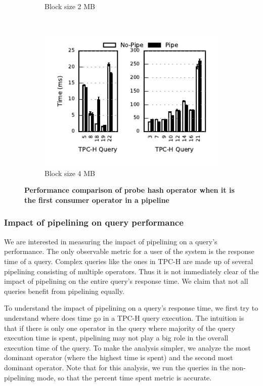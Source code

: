 \begin{figure}[t]
\begin{subfigure}[ht]{0.32\textwidth}
		\caption{Block size 2 MB}		
	\end{subfigure}
	~
	\begin{subfigure}[ht]{0.32\textwidth}
		\includegraphics[width=\textwidth]{pipeline/figures/first-consumer-comparison-4mb-withlip}	
		\caption{Block size 4 MB}
	\end{subfigure}
	\caption{\textbf{Performance comparison of probe hash operator when it is the first consumer operator in a pipeline}}
	\label{fig:first-consumer-comparison}
\end{figure}

\subsubsection{Impact of pipelining on query performance}
We are interested in measuring the impact of pipelining on a query's performance.
The only observable metric for a user of the system is the response time of a query.
Complex queries like the ones in TPC-H are made up of several pipelining consisting of multiple operators.
Thus it is not immediately clear of the impact of pipelining on the entire query's response time. 
We claim that not all queries benefit from pipelining equally.

To understand the impact of pipelining on a query's response time, we first try to understand where does time go in a TPC-H query execution.
The intuition is that if there is only one operator in the query where majority of the query execution time is spent, pipelining may not play a big role in the overall execution time of the query.
To make the analysis simpler, we analyze the most dominant operator (where the highest time is spent) and the second most dominant operator. 
Note that for this analysis, we run the queries in the non-pipelining mode, so that the percent time spent metric is accurate.

